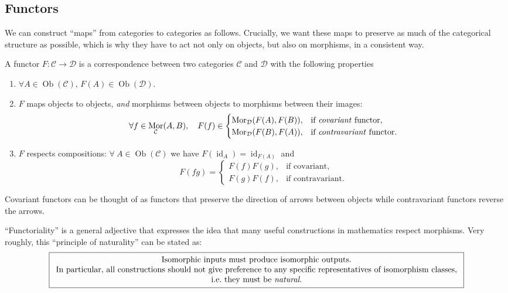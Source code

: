 \documentclass[english,letterpaper]{article}%
\numberwithin{equation}{section}
\numberwithin{figure}{section}
\numberwithin{table}{section}
\theoremstyle{definition}
\theoremstyle{definition}
\theoremstyle{definition}
\theoremstyle{plain}
\theoremstyle{plain}
\theoremstyle{plain}
\theoremstyle{plain}
\theoremstyle{remark}
\theoremstyle{remark}
\renewenvironment{gather*}{\gather}{\endgather}
\DeclareMathOperator{\mor}{Mor}
\DeclareMathOperator{\id}{id}
\DeclareMathOperator{\ob}{Ob}
\begin{document}
\subsection{Functors}

We can construct ``maps'' from categories to categories as follows.
Crucially, we want these maps to preserve as much of the categorical
structure as possible, which is why they have to act not only on objects,
but also on morphisms, in a consistent way.
\begin{defn}[Functors]
A functor $F:\mathcal{C}\rightarrow\mathcal{D}$ is a correspondence
between two categories $\mathcal{C}$ and $\mathcal{D}$ with the
following properties 
\begin{enumerate}
\item $\forall A\in\ob(\mathcal{C})$, $F(A)\in\ob(\mathcal{D})$.
\item $F$ maps objects to objects, \emph{and} morphisms between objects to
morphisms between their images:
\begin{equation}
\forall f\in\mor_{\mathcal{C}}(A,B),\quad F(f)\in\begin{cases}
\mor_{\mathcal{D}}(F(A),F(B)), & \text{if \textit{covariant} functor},\\
\mor_{\mathcal{D}}(F(B),F(A)), & \text{if \textit{contravariant} functor}.
\end{cases}
\end{equation}
 
\item $F$ respects compositions: $\forall~A\in\ob(\mathcal{C})$ we have $F(\id_{A})=\id_{F(A)}$
and
\begin{equation}
F(fg)=\begin{cases}
F(f)F(g), & \text{if covariant},\\
F(g)F(f), & \text{if contravariant}.
\end{cases}
\end{equation}
\end{enumerate}
Covariant functors can be thought of as functors that preserve the direction
of arrows between objects while contravariant functors reverse the
arrows.
\end{defn}

``Functoriality'' is a general adjective that expresses the idea
that many useful constructions in mathematics respect morphisms. Very
roughly, this ``principle of naturality'' can be stated as: 
\begin{gather*}
\boxed{\begin{array}{c}
\text{Isomorphic inputs must produce isomorphic outputs.}\\
\text{In particular, all constructions should not give preference to any specific representatives of isomorphism classes,}\\
\text{i.e.\ they must be \emph{natural}.}
\end{array}}
\end{gather*}
\end{document}

